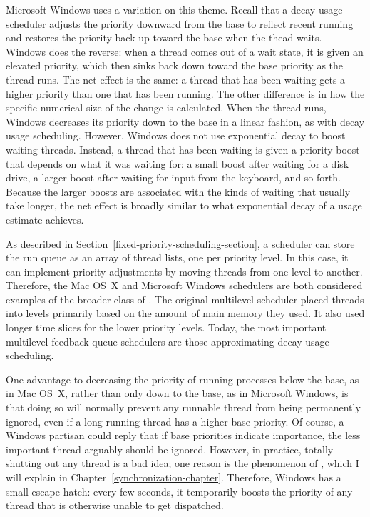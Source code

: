 Microsoft Windows uses a variation on this theme.  Recall that a decay
usage scheduler adjusts the priority downward from the base to reflect
recent running and restores the priority back up toward the base
when the thead waits.  Windows does the reverse: when a thread comes
out of a wait state, it is given an elevated priority, which then
sinks back down toward the base priority as the thread runs.  The net
effect is the same: a thread that has been waiting gets a higher
priority than one that has been running.  The other difference is in
how the specific numerical size of the change is calculated.  When the
thread runs, Windows decreases its priority down to the base in a
linear fashion, as with decay usage scheduling.  However, Windows does
not use exponential decay to boost waiting threads.  Instead, a thread
that has been waiting is given a priority boost that depends on what
it was waiting for: a small boost after waiting for a disk drive, a
larger boost after waiting for input from the keyboard, and so forth.  Because
the larger boosts are associated with the kinds of waiting that
usually take longer, the net effect is broadly similar to what
exponential decay of a usage estimate achieves.

As described in Section~\ref{fixed-priority-scheduling-section}, a
scheduler can store the run queue as an array of thread lists, one per
priority level.  In this case, it can implement priority adjustments
by moving threads from one level to another.  Therefore, the Mac OS~X
and Microsoft Windows schedulers are both considered examples of the
broader class of .  The
original multilevel scheduler placed threads into levels primarily
based on the amount of main memory they used.  It also used longer
time slices for the lower priority levels.  Today, the most important
multilevel feedback queue schedulers are those approximating
decay-usage scheduling.

One advantage to decreasing the priority of running processes below
the base, as in Mac OS~X, rather than only down to the base, as in
Microsoft Windows, is that doing so will normally prevent any runnable
thread from being permanently ignored, even if a long-running thread
has a higher base priority.  Of course, a Windows partisan could reply
that if base priorities indicate importance, the less important thread
arguably should be ignored.  However, in practice, totally shutting
out any thread is a bad idea; one reason is the phenomenon of
, which I will explain in Chapter~\ref{synchronization-chapter}.
Therefore, Windows has a small escape hatch: every few seconds, it
temporarily boosts the priority of any thread that is otherwise unable
to get dispatched.

